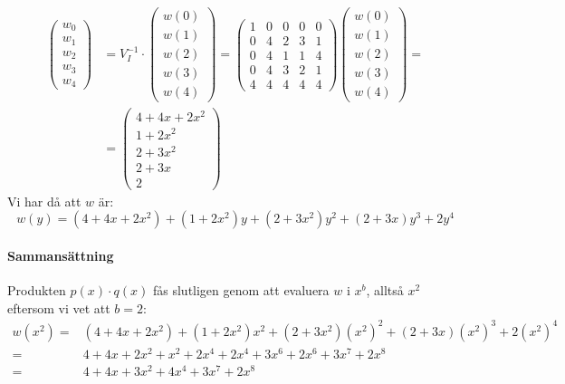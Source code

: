 \begin{align*}
  \begin{pmatrix}
    w_0 \\
    w_1 \\
    w_2 \\
    w_3 \\
    w_4
  \end{pmatrix} & =
  V_I^{-1} \cdot \begin{pmatrix}
    w(0) \\
    w(1) \\
    w(2) \\
    w(3) \\
    w(4)
  \end{pmatrix} =
  \begin{pmatrix}
    1 & 0 & 0 & 0 & 0 \\
    0 & 4 & 2 & 3 & 1 \\
    0 & 4 & 1 & 1 & 4 \\
    0 & 4 & 3 & 2 & 1 \\
    4 & 4 & 4 & 4 & 4
  \end{pmatrix}
  \begin{pmatrix}
    w(0) \\
    w(1) \\
    w(2) \\
    w(3) \\
    w(4)
  \end{pmatrix} = \\
  &= \begin{pmatrix}
    4 + 4x + 2x^2 \\
    1 + 2x^2 \\
    2 + 3x^2 \\
    2 + 3x \\
    2
  \end{pmatrix}
\end{align*}
Vi har då att $w$ är:
\begin{equation*}
  w(y) = (4 + 4x + 2x^2) + (1 + 2x^2)y + (2 + 3x^2)y^2 + (2 + 3x)y^3 + 2y^4
\end{equation*}

\paragraph{Sammansättning}
Produkten $p(x) \cdot q(x)$ fås slutligen genom att evaluera $w$ i $x^b$, alltså
$x^2$ eftersom vi vet att $b = 2$:
\begin{align*}
  w(x^2) =& (4 + 4x + 2x^2) + (1 + 2x^2)x^2 + (2 + 3x^2)(x^2)^2 + (2 + 3x)(x^2)^3 + 2(x^2)^4 \\
         =& 4 + 4x + 2x^2 + x^2 + 2x^4 + 2x^4 + 3x^6 + 2x^6 + 3x^7 + 2x^8 \\
         =& 4 + 4x + 3x^2 + 4x^4 + 3x^7 + 2x^8
\end{align*}
